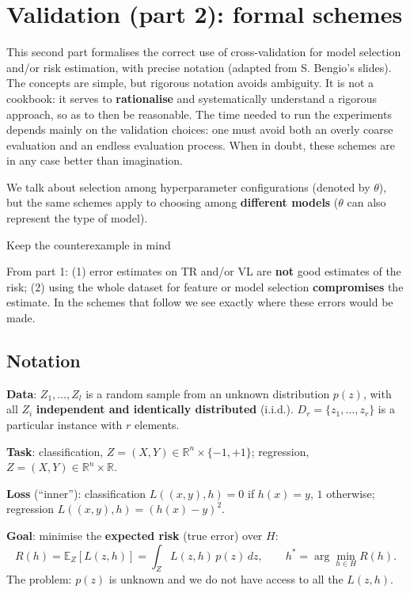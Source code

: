 \chapter{Validation (part 2): formal schemes}\label{ch-10}

This second part formalises the correct use of cross-validation for
model selection and/or risk estimation, with precise notation (adapted
from S. Bengio's slides). The concepts are simple, but rigorous notation
avoids ambiguity. It is not a cookbook: it serves to
\textbf{rationalise} and systematically understand a rigorous approach,
so as to then be reasonable. The time needed to run the experiments
depends mainly on the validation choices: one must avoid both an overly
coarse evaluation and an endless evaluation process. When in doubt,
these schemes are in any case better than imagination.

We talk about selection among hyperparameter configurations (denoted
by \(\theta\)), but the same schemes apply to choosing among
\textbf{different models} (\(\theta\) can also represent the type of
model).

\begin{boxtip}{Keep the counterexample in mind}

From part 1: (1) error estimates on TR and/or VL are \textbf{not} good
estimates of the risk; (2) using the whole dataset for feature or model
selection \textbf{compromises} the estimate. In the schemes that follow
we see exactly where these errors would be made.

\end{boxtip}

\section{Notation}\label{notazione}

\textbf{Data}: \(Z_1, \dots, Z_l\) is a random sample from an unknown
distribution \(p(z)\), with all \(Z_i\) \textbf{independent and
identically distributed} (i.i.d.). \(D_r = \{z_1, \dots, z_r\}\) is a
particular instance with \(r\) elements.

\textbf{Task}: classification,
\(Z = (X, Y) \in \mathbb{R}^n \times \{-1, +1\}\); regression,
\(Z = (X, Y) \in \mathbb{R}^n \times \mathbb{R}\).

\textbf{Loss} (``inner''): classification \(L((x,y), h) = 0\) if
\(h(x) = y\), \(1\) otherwise; regression
\(L((x,y), h) = (h(x) - y)^2\).

\textbf{Goal}: minimise the \textbf{expected risk} (true error) over
\(H\): \[
R(h) = \mathbb{E}_Z[L(z, h)] = \int_Z L(z, h)\,p(z)\,dz, \qquad h^* = \arg\min_{h \in H} R(h).
\] The problem: \(p(z)\) is unknown and we do not have access to all
the \(L(z,h)\).

